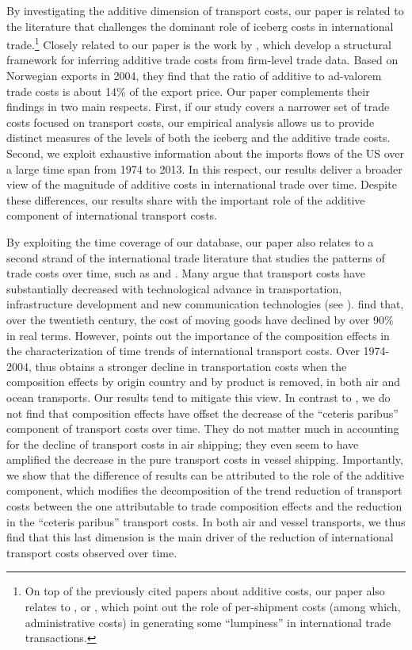 \documentclass[a4paper,11pt]{article}
\begin{document}
By investigating the additive dimension of transport costs, our paper is related to the literature that challenges the dominant role of iceberg costs in international trade.\footnote{On top of the previously cited papers about additive costs, our paper also relates to \citet{Alessandria-et-al-AER-2010}, \citet{Hornok-et-al-RES-2015} or \citet{Hornok-et-al-JIE-2015}, which point out the role of per-shipment costs (among which, administrative costs) in generating some ``lumpiness'' in international trade transactions.} Closely related to our paper is the work by \citet{Irrazabal_2015}, which develop a structural framework for inferring additive trade costs from firm-level trade data. Based on Norwegian exports in 2004, they find that the ratio of additive to ad-valorem trade costs is about 14\% of the export price. Our paper complements their findings in two main respects. First, if our study covers a narrower set of trade costs focused on transport costs, our empirical analysis allows us to provide distinct measures of the levels of both the iceberg and the additive trade costs. Second, we exploit exhaustive information about the imports flows of the US over a large time span from 1974 to 2013. In this respect, our results deliver a broader view of the magnitude of additive costs in international trade over time. Despite these differences, our results share with \citet{Irrazabal_2015} the important role of the additive component of international transport costs.\smallskip

By exploiting the time coverage of our database, our paper also relates to a second strand of the international trade literature that studies the patterns of trade costs over time, such as \cite{hummels2007} and \cite{Behar_Venables}. Many argue that transport costs have substantially decreased with technological advance in transportation, infrastructure development and new communication technologies (see \citealp{Lafourcade_Thisse}). \cite{Glaeser04} find that, over the twentieth century, the cost of moving goods have declined by over 90\% in real terms. However, \cite{hummels2007} points out the importance of the composition effects in the characterization of time trends of international transport costs. Over 1974-2004, \cite{hummels2007} thus obtains a stronger decline in transportation costs when the composition effects by origin country and by product is removed, in both air and ocean transports. Our results tend to mitigate this view. In contrast to \cite{hummels2007}, we do not find that composition effects have offset the decrease of the ``ceteris paribus'' component of transport costs over time. They do not matter much in accounting for the decline of transport costs in air shipping; they even seem to have amplified the decrease in the pure transport costs in vessel shipping. Importantly, we show that the difference of results can be attributed to the role of the additive component, which modifies the decomposition of the trend reduction of transport costs between the one attributable to trade composition effects and the reduction in the ``ceteris paribus'' transport costs. In both air and vessel transports, we thus find that this last dimension is the main driver of the reduction of international transport costs observed over time.\medskip
\end{document}
